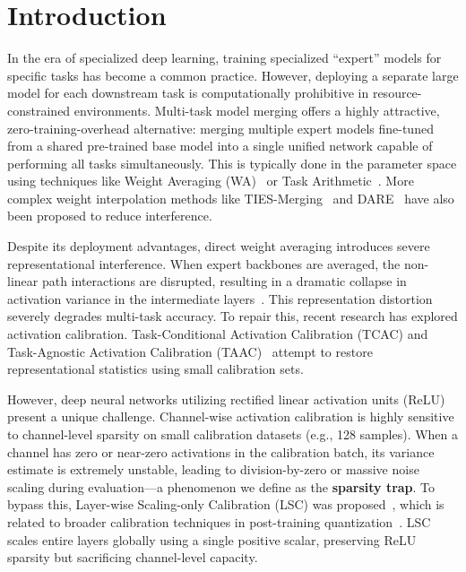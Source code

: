 \documentclass{article}
\theoremstyle{plain}
\theoremstyle{definition}
\theoremstyle{remark}
\begin{document}
\section{Introduction}
\label{sec:intro}

In the era of specialized deep learning, training specialized ``expert'' models for specific tasks has become a common practice. However, deploying a separate large model for each downstream task is computationally prohibitive in resource-constrained environments. Multi-task model merging offers a highly attractive, zero-training-overhead alternative: merging multiple expert models fine-tuned from a shared pre-trained base model into a single unified network capable of performing all tasks simultaneously. This is typically done in the parameter space using techniques like Weight Averaging (WA)~\cite{wortsman2022model,matena2022merging} or Task Arithmetic~\cite{ilharco2023editing}. More complex weight interpolation methods like TIES-Merging~\cite{yadav2023ties} and DARE~\cite{yu2023dare} have also been proposed to reduce interference.

Despite its deployment advantages, direct weight averaging introduces severe representational interference. When expert backbones are averaged, the non-linear path interactions are disrupted, resulting in a dramatic collapse in activation variance in the intermediate layers~\cite{jordan2022repair}. This representation distortion severely degrades multi-task accuracy. To repair this, recent research has explored activation calibration. Task-Conditional Activation Calibration (TCAC) and Task-Agnostic Activation Calibration (TAAC)~\cite{submission3} attempt to restore representational statistics using small calibration sets. 

However, deep neural networks utilizing rectified linear activation units (ReLU) present a unique challenge. Channel-wise activation calibration is highly sensitive to channel-level sparsity on small calibration datasets (e.g., 128 samples). When a channel has zero or near-zero activations in the calibration batch, its variance estimate is extremely unstable, leading to division-by-zero or massive noise scaling during evaluation---a phenomenon we define as the \textbf{sparsity trap}. To bypass this, Layer-wise Scaling-only Calibration (LSC) was proposed~\cite{submission9}, which is related to broader calibration techniques in post-training quantization~\cite{xiao2023smoothquant,lin2024awq,shang2024enhancing,frantar2023gptq}. LSC scales entire layers globally using a single positive scalar, preserving ReLU sparsity but sacrificing channel-level capacity.
\end{document}
